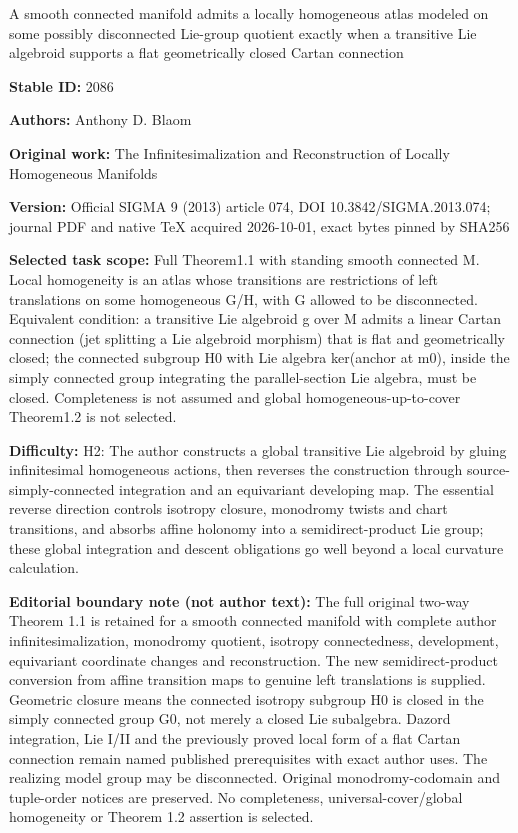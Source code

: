 \documentclass[11pt]{article}
\numberwithin{equation}{section}
\begin{document}
\begin{center}\Large A smooth connected manifold admits a locally homogeneous atlas modeled on some possibly disconnected Lie-group quotient exactly when a transitive Lie algebroid supports a flat geometrically closed Cartan connection\end{center}
\noindent\textbf{Stable ID:} 2086\par
\noindent\textbf{Authors:} Anthony D. Blaom\par
\noindent\textbf{Original work:} The Infinitesimalization and Reconstruction of Locally Homogeneous Manifolds\par
\noindent\textbf{Version:} Official SIGMA 9 (2013) article 074, DOI 10.3842/SIGMA.2013.074; journal PDF and native TeX acquired 2026-10-01, exact bytes pinned by SHA256\par
\noindent\textbf{Selected task scope:} Full Theorem1.1 with standing smooth connected M. Local homogeneity is an atlas whose transitions are restrictions of left translations on some homogeneous G/H, with G allowed to be disconnected. Equivalent condition: a transitive Lie algebroid g over M admits a linear Cartan connection (jet splitting a Lie algebroid morphism) that is flat and geometrically closed; the connected subgroup H0 with Lie algebra ker(anchor at m0), inside the simply connected group integrating the parallel-section Lie algebra, must be closed. Completeness is not assumed and global homogeneous-up-to-cover Theorem1.2 is not selected.\par
\noindent\textbf{Difficulty:} H2: The author constructs a global transitive Lie algebroid by gluing infinitesimal homogeneous actions, then reverses the construction through source-simply-connected integration and an equivariant developing map. The essential reverse direction controls isotropy closure, monodromy twists and chart transitions, and absorbs affine holonomy into a semidirect-product Lie group; these global integration and descent obligations go well beyond a local curvature calculation.\par
\noindent\textbf{Editorial boundary note (not author text):} The full original two-way Theorem 1.1 is retained for a smooth connected manifold with complete author infinitesimalization, monodromy quotient, isotropy connectedness, development, equivariant coordinate changes and reconstruction. The new semidirect-product conversion from affine transition maps to genuine left translations is supplied. Geometric closure means the connected isotropy subgroup H0 is closed in the simply connected group G0, not merely a closed Lie subalgebra. Dazord integration, Lie I/II and the previously proved local form of a flat Cartan connection remain named published prerequisites with exact author uses. The realizing model group may be disconnected. Original monodromy-codomain and tuple-order notices are preserved. No completeness, universal-cover/global homogeneity or Theorem 1.2 assertion is selected.\par
\end{document}
